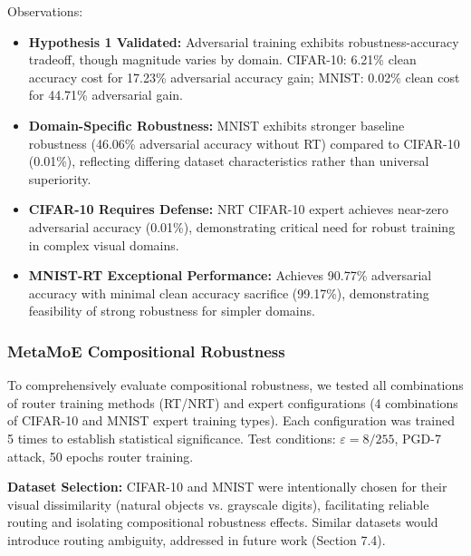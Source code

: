 \documentclass[11pt,a4paper]{article}
\begin{document}
Observations:
\begin{itemize}
    \item \textbf{Hypothesis 1 Validated:} Adversarial training exhibits robustness-accuracy tradeoff, though magnitude varies by domain. CIFAR-10: 6.21\% clean accuracy cost for 17.23\% adversarial accuracy gain; MNIST: 0.02\% clean cost for 44.71\% adversarial gain.
    \item \textbf{Domain-Specific Robustness:} MNIST exhibits stronger baseline robustness (46.06\% adversarial accuracy without RT) compared to CIFAR-10 (0.01\%), reflecting differing dataset characteristics rather than universal superiority.
    \item \textbf{CIFAR-10 Requires Defense:} NRT CIFAR-10 expert achieves near-zero adversarial accuracy (0.01\%), demonstrating critical need for robust training in complex visual domains.
    \item \textbf{MNIST-RT Exceptional Performance:} Achieves 90.77\% adversarial accuracy with minimal clean accuracy sacrifice (99.17\%), demonstrating feasibility of strong robustness for simpler domains.
\end{itemize}

\subsubsection{MetaMoE Compositional Robustness}

To comprehensively evaluate compositional robustness, we tested all combinations of router training methods (RT/NRT) and expert configurations (4 combinations of CIFAR-10 and MNIST expert training types). Each configuration was trained 5 times to establish statistical significance. Test conditions: $\varepsilon = 8/255$, PGD-7 attack, 50 epochs router training.

\textbf{Dataset Selection:} CIFAR-10 and MNIST were intentionally chosen for their visual dissimilarity (natural objects vs. grayscale digits), facilitating reliable routing and isolating compositional robustness effects. Similar datasets would introduce routing ambiguity, addressed in future work (Section 7.4).
\end{document}
